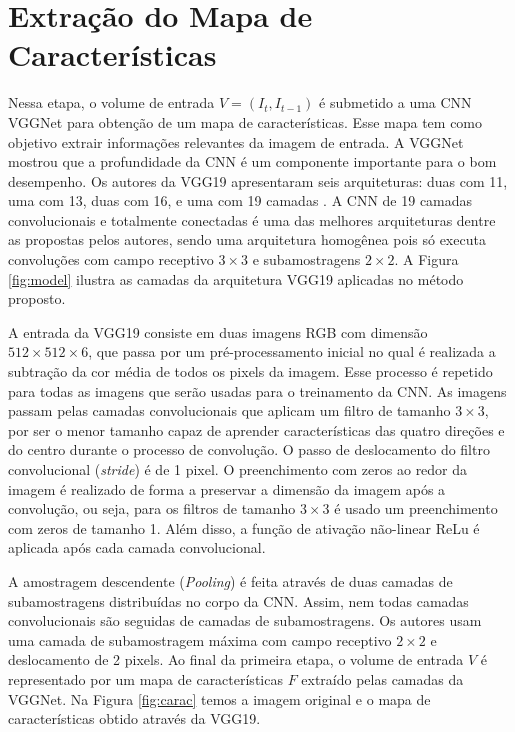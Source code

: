 \section{Extração do Mapa de Características}
   \label{sec:VGG}

Nessa etapa, o volume de entrada $V = (I_{t},I_{t-1})$ é submetido a uma CNN VGGNet \cite{VGG} para obtenção de um mapa de características.
Esse mapa tem como objetivo extrair informações relevantes da imagem de entrada.
A VGGNet mostrou que a profundidade da CNN é um componente importante para o bom desempenho. Os autores da VGG19 apresentaram seis arquiteturas: duas com 11, uma com 13, duas com 16, e uma com 19 camadas \cite{VGG}. A CNN de 19 camadas convolucionais e totalmente conectadas é uma das melhores arquiteturas dentre as propostas pelos autores, sendo uma arquitetura homogênea pois só executa convoluções com campo receptivo $3 \times 3$ e subamostragens $2 \times 2$. A Figura \ref{fig:model} ilustra as camadas da arquitetura VGG19 aplicadas no método proposto.

A entrada da VGG19 consiste em duas imagens RGB com dimensão $512 \times 512 \times 6$, que passa por um pré-processamento inicial no qual é realizada a subtração da cor média de todos os pixels da imagem. Esse processo é repetido para todas as imagens que serão usadas para o treinamento da CNN.
As imagens passam pelas camadas convolucionais que aplicam um filtro de tamanho $3 \times 3$, por ser o menor tamanho capaz de aprender características das quatro direções e do centro durante o processo de convolução. 
O passo de deslocamento do filtro convolucional (\textit{stride}) é de 1 pixel.
O preenchimento com zeros ao redor da imagem é realizado de forma a preservar a dimensão da imagem após a convolução, ou seja, para os filtros de tamanho $3 \times 3$ é usado um preenchimento com zeros de tamanho 1.
Além disso, a função de ativação não-linear ReLu é aplicada após cada camada convolucional.

A amostragem descendente (\textit{Pooling}) é feita através de duas camadas de subamostragens distribuídas no corpo da CNN. Assim, nem todas camadas convolucionais são seguidas de camadas de subamostragens. Os autores usam uma camada de subamostragem máxima com campo receptivo $2 \times 2$ e deslocamento de 2 pixels.
Ao final da primeira etapa, o volume de entrada $V$ é representado por um mapa de características $F$ extraído pelas camadas da VGGNet.
Na Figura \ref{fig:carac} temos a imagem original e o mapa de características obtido através da VGG19.

